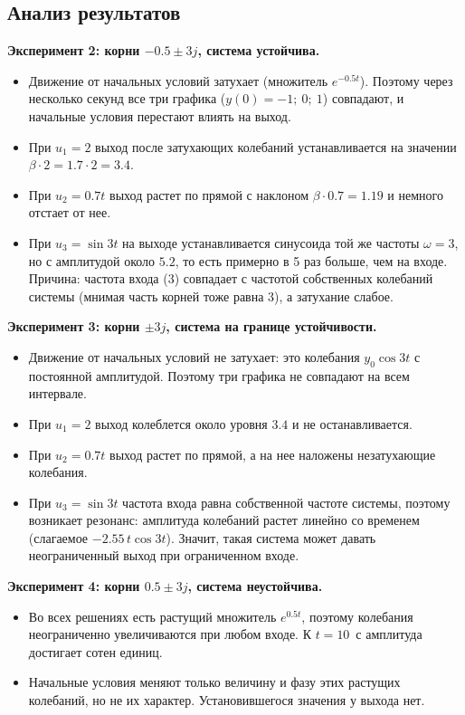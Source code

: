 \documentclass[14pt,a4paper]{extarticle}
\begin{document}
\subsection{Анализ результатов}

\textbf{Эксперимент 2: корни $-0.5 \pm 3j$, система устойчива.}
\begin{itemize}
  \item Движение от начальных условий затухает (множитель $e^{-0.5t}$). Поэтому через несколько секунд все три графика ($y(0) = -1;\ 0;\ 1$) совпадают, и начальные условия перестают влиять на выход.
  \item При $u_1 = 2$ выход после затухающих колебаний устанавливается на значении $\beta \cdot 2 = 1.7 \cdot 2 = 3.4$.
  \item При $u_2 = 0.7t$ выход растет по прямой с наклоном $\beta \cdot 0.7 = 1.19$ и немного отстает от нее.
  \item При $u_3 = \sin 3t$ на выходе устанавливается синусоида той же частоты $\omega = 3$, но с амплитудой около $5.2$, то есть примерно в 5 раз больше, чем на входе. Причина: частота входа ($3$) совпадает с частотой собственных колебаний системы (мнимая часть корней тоже равна $3$), а затухание слабое.
\end{itemize}

\textbf{Эксперимент 3: корни $\pm 3j$, система на границе устойчивости.}
\begin{itemize}
  \item Движение от начальных условий не затухает: это колебания $y_0 \cos 3t$ с постоянной амплитудой. Поэтому три графика не совпадают на всем интервале.
  \item При $u_1 = 2$ выход колеблется около уровня $3.4$ и не останавливается.
  \item При $u_2 = 0.7t$ выход растет по прямой, а на нее наложены незатухающие колебания.
  \item При $u_3 = \sin 3t$ частота входа равна собственной частоте системы, поэтому возникает резонанс: амплитуда колебаний растет линейно со временем (слагаемое $-2.55\,t\cos 3t$). Значит, такая система может давать неограниченный выход при ограниченном входе.
\end{itemize}

\textbf{Эксперимент 4: корни $0.5 \pm 3j$, система неустойчива.}
\begin{itemize}
  \item Во всех решениях есть растущий множитель $e^{0.5t}$, поэтому колебания неограниченно увеличиваются при любом входе. К $t = 10$~с амплитуда достигает сотен единиц.
  \item Начальные условия меняют только величину и фазу этих растущих колебаний, но не их характер. Установившегося значения у выхода нет.
\end{itemize}
\end{document}
